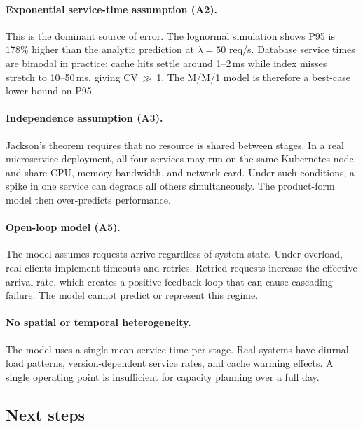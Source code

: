 \documentclass[12pt,a4paper]{article}
\begin{document}
\paragraph{Exponential service-time assumption (A2).}
This is the dominant source of error. The lognormal simulation shows P95 is 178\% higher
than the analytic prediction at $\lambda = 50$ req/s. Database service times are bimodal in practice: cache hits settle around 1--2\,ms
while index misses stretch to 10--50\,ms, giving CV\,$\gg$\,1. The M/M/1 model
is therefore a best-case lower bound on P95.

\paragraph{Independence assumption (A3).}
Jackson's theorem requires that no resource is shared between stages. In a real
microservice deployment, all four services may run on the same Kubernetes node and share
CPU, memory bandwidth, and network card. Under such conditions, a spike in one service
can degrade all others simultaneously. The product-form model then over-predicts performance.

\paragraph{Open-loop model (A5).}
The model assumes requests arrive regardless of system state. Under overload, real clients
implement timeouts and retries. Retried requests increase the effective arrival rate,
which creates a positive feedback loop that can cause cascading failure. The model cannot
predict or represent this regime.

\paragraph{No spatial or temporal heterogeneity.}
The model uses a single mean service time per stage. Real systems have diurnal load
patterns, version-dependent service rates, and cache warming effects. A single operating
point is insufficient for capacity planning over a full day.

\subsection{Next steps}
\end{document}
